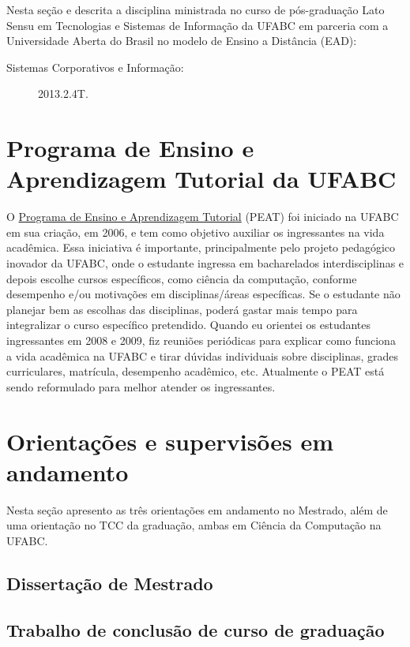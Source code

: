 Nesta seção e descrita a disciplina ministrada no curso de pós-graduação Lato Sensu em Tecnologias e Sistemas de Informação da UFABC em parceria com a Universidade Aberta do Brasil no modelo de Ensino a Distância (EAD):

\begin{description}
    \item [Sistemas Corporativos e Informação:] 2013.2.4T.
\end{description}

\section{Programa de Ensino e Aprendizagem Tutorial da UFABC}

O \href{https://prograd.ufabc.edu.br/peat}{Programa de Ensino e Aprendizagem Tutorial} (PEAT) foi iniciado na UFABC em sua criação, em 2006, e tem como objetivo auxiliar os ingressantes na vida acadêmica. Essa iniciativa é importante, principalmente pelo projeto pedagógico inovador da UFABC, onde o estudante ingressa em bacharelados interdisciplinas e depois escolhe cursos específicos, como ciência da computação, conforme desempenho e/ou motivações em disciplinas/áreas específicas. Se o estudante não planejar bem as escolhas das disciplinas, poderá gastar mais tempo para integralizar o curso específico pretendido. Quando eu orientei os estudantes ingressantes em 2008 e 2009, fiz reuniões periódicas para explicar como funciona a vida acadêmica na UFABC e tirar dúvidas individuais sobre disciplinas, grades curriculares, matrícula, desempenho acadêmico, etc. Atualmente o PEAT está sendo reformulado para melhor atender os ingressantes.


\section{Orientações e supervisões em andamento}

Nesta seção apresento as três orientações em andamento no Mestrado, além de uma orientação no TCC da graduação, ambas em Ciência da Computação na UFABC.

\subsection{Dissertação de Mestrado}



\subsection{Trabalho de conclusão de curso de graduação}

